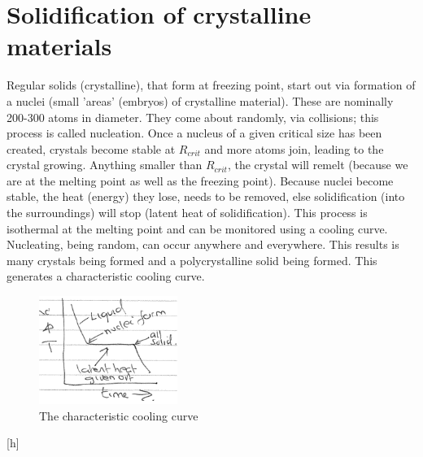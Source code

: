 \documentclass[class=report, crop=false, 12pt,a4paper]{standalone}
\begin{document}
\section{Solidification of crystalline materials}
Regular solids (crystalline), that form at freezing point, start out via formation of a nuclei (small 'areas' (embryos) of crystalline material). These are nominally 200-300 atoms in diameter. They come about randomly, via collisions; this process is called nucleation. Once a nucleus of a given critical size has been created, crystals become stable at $R_{crit}$ and more atoms join, leading to the crystal growing. Anything smaller than $R_{crit}$, the crystal will remelt (because we are at the melting point as well as the freezing point). Because nuclei become stable, the heat (energy) they lose, needs to be removed, else solidification (into the surroundings) will stop (latent heat of solidification). This process is isothermal at the melting point and can be monitored using a cooling curve. Nucleating, being random, can occur anywhere and everywhere. This results is many crystals being formed and a polycrystalline solid being formed. This generates a characteristic cooling curve.
\begin{figure}[h]
  \centering
  \includegraphics[width = 0.4\textwidth]{../img/coolingcurve}
  \caption{The characteristic cooling curve}
  \label{fig:coolingcurve}
\end{figure}[h]
\end{document}

